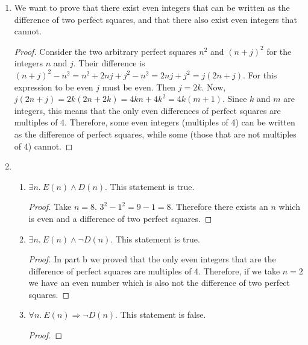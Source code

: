 \documentclass{article}
\providecommand{\implies}{}
\renewcommand{\implies}{\Rightarrow}
\theoremstyle{remark}
\begin{document}
\begin{enumerate}
\begin{enumerate}
    We want to prove that every odd integer can be written as the difference of two perfect squares.
    \begin{proof}
      Consider two consecutive perfect squares $n^2$ and $(n+1)^2$ for an integer $n$.
      Their difference is $(n+1)^2 - n^2 = n^2 + 2n + 1 - n^2 = 2n + 1$.
      Since every odd number can be written as $2k + 1$ for an integer $k$, every odd number can be written as the difference of two perfect squares.
    \end{proof}
  \item
    We want to prove that there exist even integers that can be written as the difference of two perfect squares, and that there also exist even integers that cannot.
    \begin{proof}
      Consider the two arbitrary perfect squares $n^2$ and $(n + j)^2$ for the integers $n$ and $j$.
      Their difference is $(n + j)^2 - n^2 = n^2 + 2nj + j^2 - n^2 = 2nj + j^2 = j(2n + j)$.
      For this expression to be even $j$ must be even.
      Then $j = 2k$.
      Now, $j(2n + j) = 2k(2n + 2k) = 4kn + 4k^2 = 4k(m + 1)$.
      Since $k$ and $m$ are integers, this means that the only even differences of perfect squares are multiples of 4.
      Therefore, some even integers (multiples of 4) can be written as the difference of perfect squares, while some (those that are not multiples of 4) cannot.
    \end{proof}
  \item
    \begin{enumerate}
    \item
      $\exists n.\ E(n) \land D(n)$.
      This statement is true.
      \begin{proof}
        Take $n = 8$.
        $3^2 - 1^2 = 9 - 1 = 8$.
        Therefore there exists an $n$ which is even and a difference of two perfect squares.
      \end{proof}
    \item
      $\exists n.\ E(n) \land \neg D(n)$.
      This statement is true.
      \begin{proof}
        In part b we proved that the only even integers that are the difference of perfect squares are multiples of 4.
        Therefore, if we take $n = 2$ we have an even number which is also not the difference of two perfect squares.
      \end{proof}
    \item
      $\forall n.\ E(n) \implies \neg D(n)$.
      This statement is false.
      \begin{proof}

\end{proof}
\end{enumerate}
\end{enumerate}
\end{enumerate}
\end{document}
